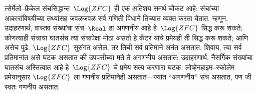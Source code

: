 \begin{ex}[स्कोलेमची विरोधापत्ती]
त्सेर्मेलो--फ्रेंकेल संचसिद्धान्त~$\Log{ZFC}$ ही एक अतिशय समर्थ चौकट
आहे; संचांच्या आकारांविषयीच्या तथ्यांसह जवळजवळ सर्व गणिती विधाने तिच्यात
व्यक्त करता येतात. म्हणून, उदाहरणार्थ, वास्तव संख्यांचा संच~$\Real$ हा
अगणनीय आहे हे~$\Log{ZFC}$ सिद्ध करू शकते; कोणत्याही संचाचा
घातसंच त्या संचापेक्षा मोठा असतो हे कँटर यांचे प्रमेयही ती सिद्ध करू शकते;
आणि असेच पुढे. $\Log{ZFC}$ सुसंगत असेल, तर तिची सर्व प्रतिमाने अनंत
असतात. शिवाय, त्या सर्व प्रतिमानांत असे घटक असतात की उपपत्तीच्या
मते ते अगणनीय असतात; उदाहरणार्थ, नैसर्गिक संख्यांचा घातसंच
अस्तित्वात आहे हे~$\Log{ZFC}$ चे प्रमेय सत्य करणारा घटक. लोव्हेनहाइम--स्कोलेम
प्रमेयानुसार $\Log{ZFC}$ ला गणनीय प्रतिमानेही असतात---ज्यांत
``अगणनीय'' संच असतात, पण जी स्वतः गणनीय असतात.
\end{ex}



